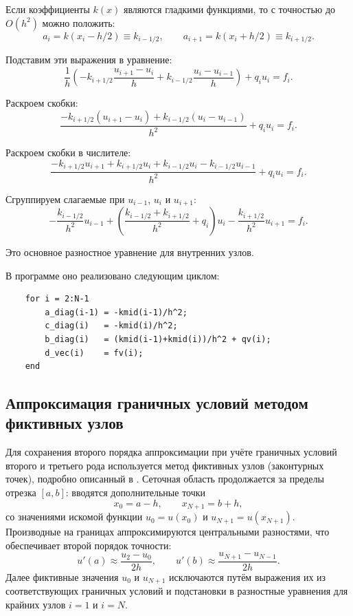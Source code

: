 \documentclass[14pt,a4paper]{extarticle}  %
\numberwithin{equation}{section}
\begin{document}
Если коэффициенты \(k(x)\) являются гладкими функциями, то с точностью до \(O(h^2)\) 
можно положить:
\[
a_i = k(x_i - h/2) \equiv k_{i-1/2}, \qquad a_{i+1} = k(x_i + h/2) \equiv k_{i+1/2}.
\]

Подставим эти выражения в уравнение:
\[
\frac{1}{h}\left( -k_{i+1/2} \frac{u_{i+1} - u_i}{h} + k_{i-1/2} \frac{u_i - u_{i-1}}{h} \right) + q_i u_i = f_i.
\]

Раскроем скобки:
\[
\frac{-k_{i+1/2}(u_{i+1} - u_i) + k_{i-1/2}(u_i - u_{i-1})}{h^2} + q_i u_i = f_i.
\]

Раскроем скобки в числителе:
\[
\frac{-k_{i+1/2}u_{i+1} + k_{i+1/2}u_i + k_{i-1/2}u_i - k_{i-1/2}u_{i-1}}{h^2} + q_i u_i = f_i.
\]

Сгруппируем слагаемые при \(u_{i-1}\), \(u_i\) и \(u_{i+1}\):
\begin{equation}
    -\frac{k_{i-1/2}}{h^2} u_{i-1} + 
    \left( \frac{k_{i-1/2} + k_{i+1/2}}{h^2} + q_i \right) u_i - 
    \frac{k_{i+1/2}}{h^2} u_{i+1} = f_i.
    \label{eq:internal_node}
\end{equation}

Это основное разностное уравнение для внутренних узлов.

В программе оно реализовано следующим циклом:

\begin{verbatim}
    for i = 2:N-1
        a_diag(i-1) = -kmid(i-1)/h^2;
        c_diag(i)   = -kmid(i)/h^2;
        b_diag(i)   = (kmid(i-1)+kmid(i))/h^2 + qv(i);
        d_vec(i)    = fv(i);
    end
\end{verbatim}

\subsection{Аппроксимация граничных условий методом фиктивных узлов}

Для сохранения второго порядка аппроксимации при учёте
граничных условий второго и третьего рода используется
метод фиктивных узлов (законтурных точек), подробно
описанный в \cite{marchuk_methods}.
Сеточная область продолжается за пределы отрезка $[a,b]$:
вводятся дополнительные точки
\[
x_0 = a - h, \qquad x_{N+1} = b + h,
\]
со значениями искомой функции $u_0 = u(x_0)$ и $u_{N+1} = u(x_{N+1})$.
Производные на границах аппроксимируются центральными
разностями, что обеспечивает второй порядок точности:
\begin{equation}
    u'(a) \approx \frac{u_2 - u_0}{2h}, \qquad
    u'(b) \approx \frac{u_{N+1} - u_{N-1}}{2h}.
    \label{eq:neumann_approx}
\end{equation}
Далее фиктивные значения $u_0$ и $u_{N+1}$ исключаются
путём выражения их из соответствующих граничных условий
и подстановки в разностные уравнения для крайних узлов
$i=1$ и $i=N$.
\end{document}
